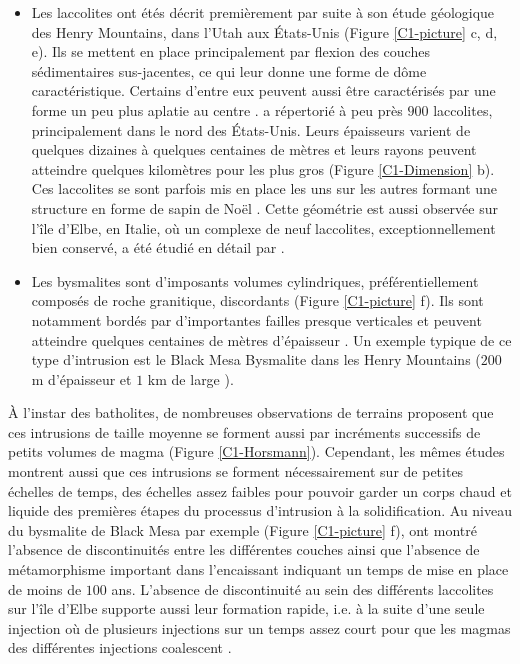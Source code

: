 \begin{itemize}
\item   Les    laccolites   ont    étés   décrit    premièrement   par
  \citet{Gilbert:1877uk}  suite  à  son  étude  géologique  des  Henry
  Mountains, dans l'Utah aux États-Unis (Figure \ref{C1-picture} c, d,
  e).  Ils se mettent en  place principalement par flexion des couches
  sédimentaires  sus-jacentes, ce  qui leur  donne une  forme de  dôme
  caractéristique.    Certains   d'entre   eux  peuvent   aussi   être
  caractérisés  par   une  forme  un   peu  plus  aplatie   au  centre
  \citep{Koch:1981if}. \citet{E:2015tl} a répertorié  à peu près $900$
  laccolites,  principalement  dans  le nord  des  États-Unis.   Leurs
  épaisseurs  varient de  quelques  dizaines à  quelques centaines  de
  mètres et  leurs rayons  peuvent atteindre quelques  kilomètres pour
  les plus gros (Figure \ref{C1-Dimension} b).  Ces laccolites se sont
  parfois mis en place les uns sur les autres formant une structure en
  forme de sapin de Noël  \citep{E:2015tl}.  Cette géométrie est aussi
  observée  sur  l'île d'Elbe,  en  Italie,  où  un complexe  de  neuf
  laccolites, exceptionnellement bien conservé, a été étudié en détail
  par \citet{Rocchi:2002jy}.

\item   Les   bysmalites   sont  d'imposants   volumes   cylindriques,
  préférentiellement composés de roche granitique, discordants (Figure
  \ref{C1-picture} f).   Ils sont  notamment bordés  par d'importantes
  failles presque  verticales et peuvent atteindre  quelques centaines
  de mètres d'épaisseur \citep{Johnson:1973ho}.  Un exemple typique de
  ce  type d'intrusion  est le  Black  Mesa Bysmalite  dans les  Henry
  Mountains   ($200$    m   d'épaisseur    et   $1$   km    de   large
  \citep{Morgan:2008hj}).
\end{itemize}

À  l'instar des  batholites,  de nombreuses  observations de  terrains
proposent que  ces intrusions de  taille moyenne se forment  aussi par
incréments     successifs    de     petits     volumes    de     magma
\citep{Habert:2004wg,Horsman:2005ct,Morgan:2008hj}             (Figure
\ref{C1-Horsmann}).  Cependant,  les mêmes  études montrent  aussi que
ces intrusions  se forment nécessairement  sur de petites  échelles de
temps, des échelles  assez faibles pour pouvoir garder  un corps chaud
et  liquide  des  premières  étapes  du  processus  d'intrusion  à  la
solidification.   Au niveau  du bysmalite  de Black  Mesa par  exemple
(Figure   \ref{C1-picture}   f),  \citet{Habert:2004wg}   ont   montré
l'absence de  discontinuités entre  les différentes couches  ainsi que
l'absence de  métamorphisme important  dans l'encaissant  indiquant un
temps  de  mise  en  place  de  moins  de  $100$  ans.   L'absence  de
discontinuité  au  sein des  différents  laccolites  sur l'île  d'Elbe
supporte aussi  leur formation  rapide, i.e.  à  la suite  d'une seule
injection où de plusieurs injections sur un temps assez court pour que
les magmas des différentes injections coalescent \citep{Roni:2014gt}.

